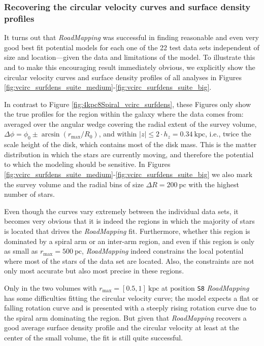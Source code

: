\documentclass[iop,revtex4,numberedappendix,appendixfloats]{emulateapj}
\newcommand{\RM}{{\sl RoadMapping}}
\begin{document}
\subsubsection{Recovering the circular velocity curves and surface density profiles} \label{sec:circvel_surfdens}

It turns out that \RM{} was successful in finding reasonable and even very good best fit potential models for each one of the 22 test data sets independent of size and location---given the data and limitations of the model. To illustrate this and to make this encouraging result immediately obvious, we explicitly show the circular velocity curves and surface density profiles of all analyses in Figures \ref{fig:vcirc_surfdens_suite_medium}-\ref{fig:vcirc_surfdens_suite_big}. 

In contrast to Figure \ref{fig:4kpc8Spiral_vcirc_surfdens}, these Figures only show the true profiles for the region within the galaxy where the data comes from: averaged over the angular wedge covering the radial extent of the survey volume, $\Delta \phi = \phi_0 \pm \arcsin(r_\text{max}/R_0)$, and within $|z| \leq 2 \cdot h_z = 0.34~\text{kpc}$, i.e., twice the scale height of the disk, which contains most of the disk mass. This is the matter distribution in which the stars are currently moving, and therefore the potential to which the modeling should be sensitive. In Figures \ref{fig:vcirc_surfdens_suite_medium}-\ref{fig:vcirc_surfdens_suite_big} we also mark the survey volume and the radial bins of size $\Delta R =200~\text{pc}$ with the highest number of stars. 

Even though the curves vary extremely between the individual data sets, it becomes very obvious that it is indeed the regions in which the majority of stars is located that drives the \RM{} fit. Furthermore, whether this region is dominated by a spiral arm or an inter-arm region, and even if this region is only as small as $r_\text{max}=500~\text{pc}$, \RM{} indeed constrains the local potential where most of the stars of the data set are located. Also, the constraints are not only most accurate but also most precise in these regions.

Only in the two volumes with $r_\text{max}=[0.5,1]~\text{kpc}$ at position \texttt{S8} \RM{} has some difficulties fitting the circular velocity curve; the model expects a flat or falling rotation curve and is presented with a steeply rising rotation curve due to the spiral arm dominating the region. But given that \RM{} recovers a good average surface density profile and the circular velocity at least at the center of the small volume, the fit is still quite successful. 
\end{document}
